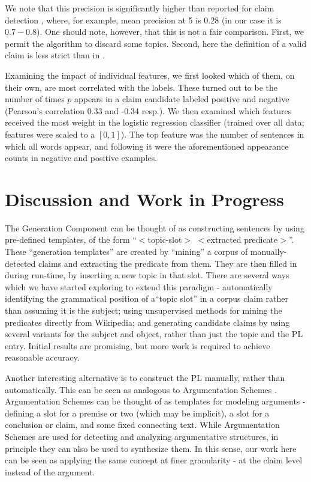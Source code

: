 \documentclass[11pt]{article}
\begin{document}
We note that this precision is significantly higher than reported for claim detection \cite{claim-detection}, where, for example, mean precision at 5 is $0.28$ (in our case it is $0.7 - 0.8$).  One should note, however, that this is not a fair comparison. First, we permit the algorithm to discard some topics. Second, here the definition of a valid claim is less strict than in \cite{claim-detection}.

Examining the impact of individual features, we first looked which of them, on their own,  are most correlated with the labels. These turned out to be the number of times $p$ appears in a claim candidate labeled positive and negative (Pearson's correlation 0.33 and -0.34 resp.). We then examined which features received the most weight in the logistic regression classifier (trained over all data; features were scaled to a $[0,1]$). The top feature was the number of sentences in which all words appear, and following it were the aforementioned appearance counts in negative and positive examples.

\section{Discussion and Work in Progress}
The Generation Component can be thought of as constructing sentences by using pre-defined templates, of the form ``$<$topic-slot$>$ $<$extracted predicate$>$''. These ``generation templates'' are created by ``mining'' a corpus of manually-detected claims and extracting the predicate from them. They are then filled in during run-time, by inserting a new topic in that slot. There are several ways which we have started exploring to extend this paradigm - automatically identifying the grammatical position of a``topic slot'' in a corpus claim rather than assuming it is the subject; using unsupervised methods for mining the predicates directly from Wikipedia; and generating candidate claims by using several variants for the subject and object, rather than just the topic and the PL entry. Initial results are promising, but more work is required to achieve reasonable accuracy.

Another interesting alternative is to construct the PL manually, rather than automatically. This can be seen as analogous to Argumentation Schemes \cite{arg-schemes}. Argumentation Schemes can be thought of as templates for modeling arguments - defining a slot for a premise or two (which may be implicit), a slot for a conclusion or claim, and some fixed connecting text. While Argumentation Schemes are used for detecting \cite{arg-schemes-mining} and analyzing argumentative structures, in principle they can also be used to synthesize them. In this sense, our work here can be seen as applying the same concept at finer granularity - at the claim level instead of the argument. 
\end{document}
